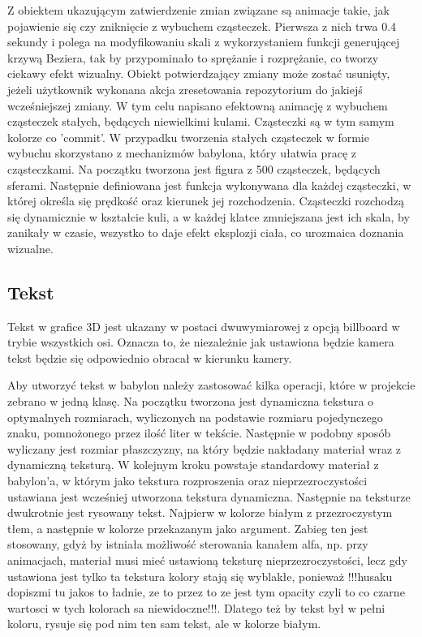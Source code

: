 \documentclass[11pt,a4paper,polish,thesis]{dcsbook}
\begin{document}
	Z obiektem ukazującym zatwierdzenie zmian związane są animacje takie, jak pojawienie się czy zniknięcie z wybuchem cząsteczek. Pierwsza z nich trwa 0.4 sekundy i polega na modyfikowaniu skali z wykorzystaniem funkcji generującej krzywą Beziera, tak by przypominało to sprężanie i rozprężanie, co tworzy ciekawy efekt wizualny. Obiekt potwierdzający zmiany może zostać usunięty, jeżeli użytkownik wykonana akcja zresetowania repozytorium do jakiejś wcześniejszej zmiany. W tym celu napisano efektowną animację z wybuchem cząsteczek stałych, będących niewielkimi kulami. Cząsteczki są w tym samym kolorze co 'commit'. W przypadku tworzenia stałych cząsteczek w formie wybuchu skorzystano z mechanizmów babylona, który ułatwia pracę z cząsteczkami. Na początku tworzona jest figura z 500 cząsteczek, będących sferami. Następnie definiowana jest funkcja wykonywana dla każdej cząsteczki, w której określa się prędkość oraz kierunek jej rozchodzenia. Cząsteczki rozchodzą się dynamicznie w kształcie kuli, a w każdej klatce zmniejszana jest ich skala, by zanikały w czasie, wszystko to daje efekt eksplozji ciała, co urozmaica doznania wizualne. 
 
	\subsection{Tekst}
	Tekst w grafice 3D jest ukazany w postaci dwuwymiarowej z opcją billboard w trybie  wszystkich osi. Oznacza to, że niezależnie jak ustawiona będzie kamera tekst będzie się odpowiednio obracał w kierunku kamery. 

	Aby utworzyć tekst w babylon należy zastosować kilka operacji, które w projekcie zebrano w jedną klasę. Na początku tworzona jest dynamiczna tekstura o optymalnych rozmiarach, wyliczonych na podstawie rozmiaru pojedynczego znaku, pomnożonego przez ilość liter w tekście. Następnie w podobny sposób wyliczany jest rozmiar płaszczyzny, na który będzie nakładany materiał wraz z dynamiczną teksturą. W kolejnym kroku powstaje standardowy materiał z babylon'a, w którym jako tekstura rozproszenia oraz nieprzezroczystości ustawiana jest wcześniej utworzona tekstura dynamiczna. Następnie na teksturze dwukrotnie jest rysowany tekst. Najpierw w kolorze białym z przezroczystym tłem, a następnie w kolorze przekazanym jako argument. Zabieg ten jest stosowany, gdyż by istniała możliwość sterowania kanałem alfa, np. przy animacjach, materiał musi mieć ustawioną teksturę nieprzezroczystości, lecz gdy ustawiona jest tylko ta tekstura kolory stają się wyblakłe, ponieważ !!!husaku dopiszmi tu jakos to ładnie, ze to przez to ze jest tym opacity czyli to co czarne wartosci w tych kolorach sa niewidoczne!!!.
	Dlatego też by tekst był w pełni koloru, rysuje się pod nim ten sam tekst, ale w kolorze białym.
	
\end{document}
